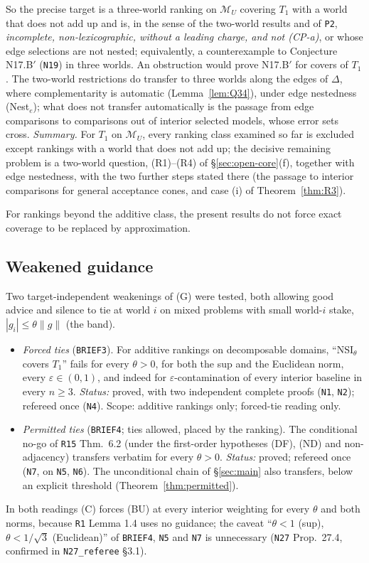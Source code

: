 \documentclass[11pt]{article}
\theoremstyle{definition}
\theoremstyle{remark}
\newcommand{\M}{\mathcal M}
\newcommand{\src}[1]{\texttt{#1}}
\begin{document}
So the precise target is a three-world ranking on $\M_U$ covering $T_1$ with a world that does not add up and is, in the sense of the two-world results and of \src{P2}, \emph{incomplete, non-lexicographic, without a leading charge, and not (CP-a)}, or whose edge selections are not nested; equivalently, a counterexample to Conjecture N17.B$'$ (\src{N19}) in three worlds. An obstruction would prove N17.B$'$ for covers of $T_1$. The two-world restrictions do transfer to three worlds along the edges of $\Delta$, where complementarity is automatic (Lemma~\ref{lem:Q34}), under edge nestedness (Nest$_e$); what does not transfer automatically is the passage from edge comparisons to comparisons out of interior selected models, whose error sets cross. \emph{Summary.} For $T_1$ on $\M_U$, every ranking class examined so far is excluded except rankings with a world that does not add up; the decisive remaining problem is a two-world question, (R1)--(R4) of \S\ref{sec:open-core}(f), together with edge nestedness, with the two further steps stated there (the passage to interior comparisons for general acceptance cones, and case (i) of Theorem~\ref{thm:R3}).

For rankings beyond the additive class, the present results do not force exact coverage to be replaced by approximation.

\subsection{Weakened guidance}\label{sec:open-ties}
Two target-independent weakenings of (G) were tested, both allowing good advice and silence to tie at world $i$ on mixed problems with small world-$i$ stake, $|g_i|\le\theta\|g\|$ (the band).
\begin{itemize}[leftmargin=*]
\item \emph{Forced ties} (\src{BRIEF3}). For additive rankings on decomposable domains, ``NSI$_\theta$ covers $T_1$'' fails for every $\theta>0$, for both the sup and the Euclidean norm, every $\varepsilon\in(0,1)$, and indeed for $\varepsilon$-contamination of every interior baseline in every $n\ge3$. \emph{Status:} proved, with two independent complete proofs (\src{N1}, \src{N2}); refereed once (\src{N4}). Scope: additive rankings only; forced-tie reading only.
\item \emph{Permitted ties} (\src{BRIEF4}; ties allowed, placed by the ranking). The conditional no-go of \src{R15} Thm.~6.2 (under the first-order hypotheses (DF), (ND) and non-adjacency) transfers verbatim for every $\theta>0$. \emph{Status:} proved; refereed once (\src{N7}, on \src{N5}, \src{N6}). The unconditional chain of \S\ref{sec:main} also transfers, below an explicit threshold (Theorem~\ref{thm:permitted}).
\end{itemize}
In both readings (C) forces (BU) at every interior weighting for every $\theta$ and both norms, because \src{R1} Lemma 1.4 uses no guidance; the caveat ``$\theta<1$ (sup), $\theta<1/\sqrt3$ (Euclidean)'' of \src{BRIEF4}, \src{N5} and \src{N7} is unnecessary (\src{N27} Prop.~27.4, confirmed in \src{N27\_referee} \S3.1).
\end{document}
